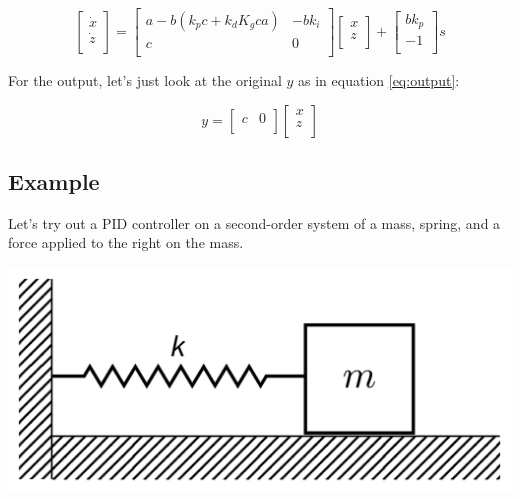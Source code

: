 \documentclass[10pt,letterpaper]{article}
\begin{document}
\begin{equation} \label{eq:final_state}
\begin{bmatrix}
    \dot{x} \\
    \dot{z} \\
\end{bmatrix} =
\begin{bmatrix}
	a - b (k_p c + k_d K_g c a) & -b k_i \\
	c & 0 \\
\end{bmatrix}
\begin{bmatrix}
	x \\
	z \\
\end{bmatrix} + 
\begin{bmatrix}
	b k_p \\
	-1 \\
\end{bmatrix} s
\end{equation}

For the output, let's just look at the original $y$ as in equation \ref{eq:output}:

\begin{equation} \label{eq:final_output}
y = \begin{bmatrix}
	c & 0 \\
\end{bmatrix}
\begin{bmatrix}
	x \\
	z \\
\end{bmatrix}
\end{equation}

\subsection*{Example}
Let's try out a PID controller on a second-order system of a mass, spring, and a force applied to the right on the mass.

\begin{center}
\includegraphics[scale=0.2]{spring-mass}
\end{center}
\end{document}
